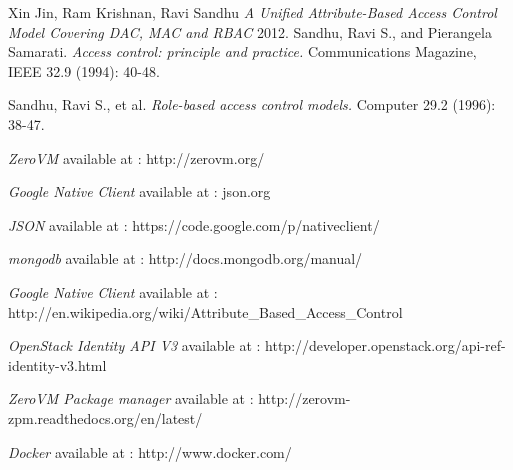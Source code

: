 \begin{thebibliography}{1}

   Xin Jin, Ram Krishnan, Ravi Sandhu  {\em A Unified Attribute-Based Access Control Model Covering DAC, MAC and RBAC}  2012.
    Sandhu, Ravi S., and Pierangela Samarati. {\em Access control: principle and practice.} Communications Magazine, IEEE 32.9 (1994): 40-48.
   
  Sandhu, Ravi S., et al. {\em Role-based access control models.} Computer 29.2 (1996): 38-47.  
   

      {\em ZeroVM}  available at : http://zerovm.org/   
  
      {\em Google Native Client }  available at : json.org
  
        {\em JSON }  available at : https://code.google.com/p/nativeclient/
    
     {\em mongodb}  available at : http://docs.mongodb.org/manual/
 
      {\em Google Native Client }  available at : http://en.wikipedia.org/wiki/Attribute\_Based\_Access\_Control

    {\em OpenStack Identity API V3}  available at : http://developer.openstack.org/api-ref-identity-v3.html 
  
      {\em ZeroVM Package manager }  available at : http://zerovm-zpm.readthedocs.org/en/latest/
  
        {\em Docker }  available at : http://www.docker.com/
    




  \end{thebibliography}